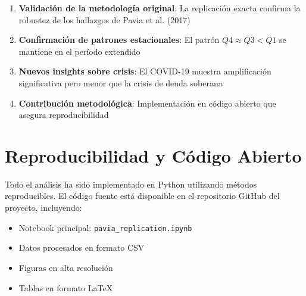 \documentclass[12pt,a4paper]{article}
\begin{document}
\begin{enumerate}
\item \textbf{Validación de la metodología original}: La replicación exacta confirma la robustez de los hallazgos de Pavia et al. (2017)
\item \textbf{Confirmación de patrones estacionales}: El patrón $Q4 \approx Q3 < Q1$ se mantiene en el período extendido
\item \textbf{Nuevos insights sobre crisis}: El COVID-19 muestra amplificación significativa pero menor que la crisis de deuda soberana
\item \textbf{Contribución metodológica}: Implementación en código abierto que asegura reproducibilidad
\end{enumerate}

\section{Reproducibilidad y Código Abierto}

Todo el análisis ha sido implementado en Python utilizando métodos reproducibles. El código fuente está disponible en el repositorio GitHub del proyecto, incluyendo:

\begin{itemize}
\item Notebook principal: \texttt{pavia\_replication.ipynb}
\item Datos procesados en formato CSV
\item Figuras en alta resolución
\item Tablas en formato LaTeX
\end{itemize}



\end{document}
